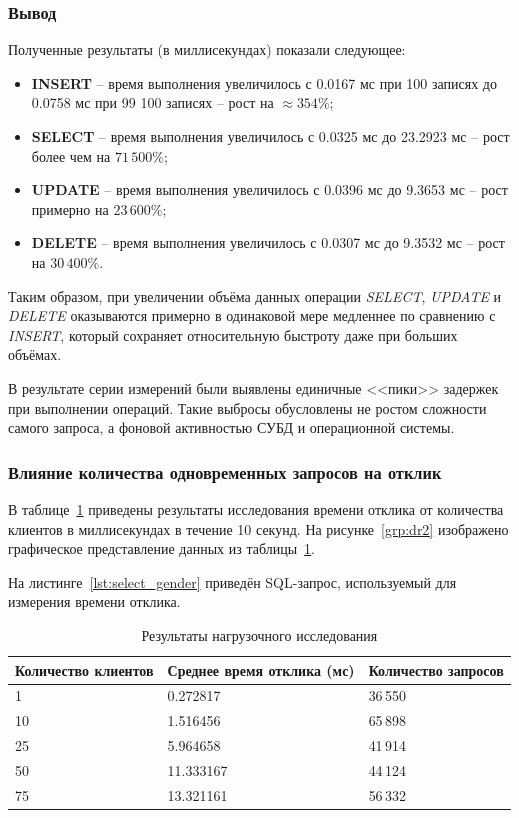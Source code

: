 \subsubsection*{\normalsize Вывод}

 Полученные результаты (в миллисекундах) показали следующее:

\begin{itemize}
	\item \textbf{INSERT} -- время выполнения увеличилось с 0.0167 мс при 100 записях до 0.0758 мс при 99 100 записях -- рост на \(\approx354\%\);
	\item \textbf{SELECT} -- время выполнения увеличилось с 0.0325 мс до 23.2923 мс -- рост более чем на \(71\,500\%\);
	\item \textbf{UPDATE} -- время выполнения увеличилось с 0.0396 мс до 9.3653 мс -- рост примерно на \(23\,600\%\);
	\item \textbf{DELETE} -- время выполнения увеличилось  с 0.0307 мс до 9.3532 мс -- рост на \(30\,400\%\).
\end{itemize}

Таким образом, при увеличении объёма данных операции \textit{SELECT}, \textit{UPDATE} и \textit{DELETE} оказываются примерно в одинаковой мере медленнее по сравнению с \textit{INSERT}, который сохраняет относительную быстроту даже при больших объёмах.

В результате серии измерений были выявлены единичные <<пики>> задержек при выполнении операций. Такие выбросы обусловлены не ростом сложности самого запроса, а фоновой активностью СУБД и операционной системы.

\subsubsection*{\normalsize Влияние количества одновременных запросов на отклик}

В таблице~\ref{operation-times2} приведены результаты исследования времени отклика от количества клиентов в миллисекундах в течение 10 секунд. На рисунке~\ref{grp:dr2} изображено графическое представление данных из таблицы~\ref{operation-times2}.

На листинге~\ref{lst:select_gender} приведён SQL-запрос, используемый для измерения времени отклика.

\begin{table}[h!]
	\centering
	\caption{Результаты нагрузочного исследования}
	\begin{tabular}{|p{3.5cm}|p{4.5cm}|p{3.5cm}|}
		\hline
		\textbf{Количество клиентов} & \textbf{Среднее время отклика (мс)} & \textbf{Количество запросов} \\
		\hline
		1  & 0.272817  & 36\,550 \\
		10 & 1.516456  & 65\,898 \\
		25 & 5.964658  & 41\,914 \\
		50 & 11.333167 & 44\,124 \\
		75 & 13.321161 & 56\,332 \\
		\hline
	\end{tabular}
	\label{operation-times2}
\end{table}

